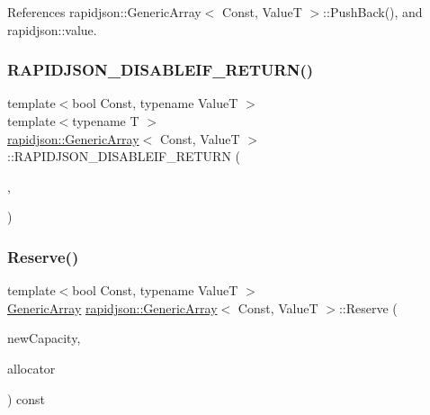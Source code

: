 References rapidjson\+::\+Generic\+Array$<$ Const, Value\+T $>$\+::\+Push\+Back(), and rapidjson\+::value.

\mbox{\label{classrapidjson_1_1_generic_array_a9f24db0f4c3d82a836d2722fd1e6f34c}} 
\subsubsection{\texorpdfstring{RAPIDJSON\_DISABLEIF\_RETURN()}{RAPIDJSON\_DISABLEIF\_RETURN()}}
{\footnotesize\ttfamily template$<$bool Const, typename ValueT $>$ \\
template$<$typename T $>$ \\
\mbox{\hyperlink{classrapidjson_1_1_generic_array}{rapidjson\+::\+Generic\+Array}}$<$ Const, ValueT $>$\+::R\+A\+P\+I\+D\+J\+S\+O\+N\+\_\+\+D\+I\+S\+A\+B\+L\+E\+I\+F\+\_\+\+R\+E\+T\+U\+RN (\begin{DoxyParamCaption}\item[{(internal\+::\+Or\+Expr$<$ internal\+::\+Is\+Pointer$<$ T $>$, \mbox{\hyperlink{structrapidjson_1_1internal_1_1_is_generic_value}{internal\+::\+Is\+Generic\+Value}}$<$ T $>$ $>$)}]{,  }\item[{(\mbox{\hyperlink{classrapidjson_1_1_generic_array_a363f892bf386776e236f5db273f2599f}{const}} \mbox{\hyperlink{classrapidjson_1_1_generic_array}{Generic\+Array}}$<$ Const, ValueT $>$ \&)}]{ }\end{DoxyParamCaption})}

\mbox{\label{classrapidjson_1_1_generic_array_ad1110e43990424e416555541731f229f}} 
\subsubsection{\texorpdfstring{Reserve()}{Reserve()}}
{\footnotesize\ttfamily template$<$bool Const, typename ValueT $>$ \\
\mbox{\hyperlink{classrapidjson_1_1_generic_array}{Generic\+Array}} \mbox{\hyperlink{classrapidjson_1_1_generic_array}{rapidjson\+::\+Generic\+Array}}$<$ Const, ValueT $>$\+::Reserve (\begin{DoxyParamCaption}\item[{\mbox{\hyperlink{namespacerapidjson_a44eb33eaa523e36d466b1ced64b85c84}{Size\+Type}}}]{new\+Capacity,  }\item[{\mbox{\hyperlink{classrapidjson_1_1_generic_array_a82298d507b2b15c9d909c25a32f5afeb}{Allocator\+Type}} \&}]{allocator }\end{DoxyParamCaption}) const}



